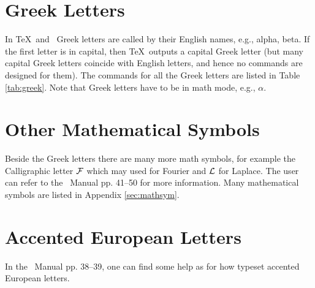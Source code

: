 \section{Greek Letters}
In \TeX\ and \LaTeXe\ Greek letters are called by  their English names,
e.g., alpha, beta. If the first letter is in capital, then \TeX\ outputs
a capital Greek letter (but many capital Greek letters coincide with
English letters, and hence no commands are designed for them).
The commands for all the Greek letters are listed in
Table \ref{tab:greek}. Note that Greek letters have to be in math mode,
e.g., $\alpha$.

\section{Other Mathematical Symbols}
Beside the Greek letters there are many more math symbols, for example
the Calligraphic letter $\cal F$ which may used for Fourier and
$\cal L$ for Laplace. The user can refer to the \LaTeXe\ Manual\cite{lp:latex}
pp. 41--50 for more information.  Many mathematical
symbols are listed in Appendix \ref{sec:mathsym}.

\section{Accented European Letters}
In the \LaTeXe\ Manual\cite{lp:latex} pp. 38--39, one can find some help as
for how typeset accented European letters.


